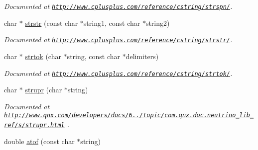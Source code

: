\begin{DoxyCompactItemize}
\begin{DoxyCompactList}\small\item\em Documented at \href{http://www.cplusplus.com/reference/cstring/strspn/}{\tt http\-://www.\-cplusplus.\-com/reference/cstring/strspn/}. \end{DoxyCompactList}\item 
\hypertarget{group__string_gaedc7fca209acba7af0ad9e91573e89a6}{char $\ast$ \hyperlink{group__string_gaedc7fca209acba7af0ad9e91573e89a6}{strstr} (const char $\ast$string1, const char $\ast$string2)}\label{group__string_gaedc7fca209acba7af0ad9e91573e89a6}

\begin{DoxyCompactList}\small\item\em Documented at \href{http://www.cplusplus.com/reference/cstring/strstr/}{\tt http\-://www.\-cplusplus.\-com/reference/cstring/strstr/}. \end{DoxyCompactList}\item 
\hypertarget{group__string_gac611854fcb6575e80b790175acfb509a}{char $\ast$ \hyperlink{group__string_gac611854fcb6575e80b790175acfb509a}{strtok} (char $\ast$string, const char $\ast$delimiters)}\label{group__string_gac611854fcb6575e80b790175acfb509a}

\begin{DoxyCompactList}\small\item\em Documented at \href{http://www.cplusplus.com/reference/cstring/strtok/}{\tt http\-://www.\-cplusplus.\-com/reference/cstring/strtok/}. \end{DoxyCompactList}\item 
\hypertarget{group__string_ga3b3a432051b3200971d320bae89dbf2d}{char $\ast$ \hyperlink{group__string_ga3b3a432051b3200971d320bae89dbf2d}{strupr} (char $\ast$string)}\label{group__string_ga3b3a432051b3200971d320bae89dbf2d}

\begin{DoxyCompactList}\small\item\em Documented at \href{http://www.qnx.com/developers/docs/6.5.0/topic/com.qnx.doc.neutrino_lib_ref/s/strupr.html}{\tt http\-://www.\-qnx.\-com/developers/docs/6../topic/com.\-qnx.\-doc.\-neutrino\-\_\-lib\-\_\-ref/s/strupr.\-html} . \end{DoxyCompactList}\item 
\hypertarget{group__string_ga11747b633c46b24cb3e76042cba33ba0}{double \hyperlink{group__string_ga11747b633c46b24cb3e76042cba33ba0}{atof} (const char $\ast$string)}\label{group__string_ga11747b633c46b24cb3e76042cba33ba0}


\end{DoxyCompactItemize}

